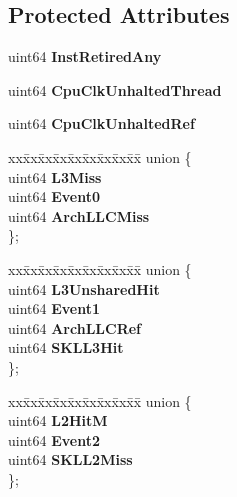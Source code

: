 \subsection*{Protected Attributes}
\begin{DoxyCompactItemize}
\item 
\mbox{\label{classBasicCounterState_a32d89649ba3e48ad8d0cfe05b0e5e2fb}} 
uint64 {\bfseries Inst\+Retired\+Any}
\item 
\mbox{\label{classBasicCounterState_aa55976b14e3f5d61eac958ea5f80f35c}} 
uint64 {\bfseries Cpu\+Clk\+Unhalted\+Thread}
\item 
\mbox{\label{classBasicCounterState_a9c64ac8f2c735b0a693a066ff99b9bc1}} 
uint64 {\bfseries Cpu\+Clk\+Unhalted\+Ref}
\item 
\mbox{\label{classBasicCounterState_a21d9f8b810e7625a425c469cd6fae52f}} 
\begin{tabbing}
xx\=xx\=xx\=xx\=xx\=xx\=xx\=xx\=xx\=\kill
union \{\\
\>uint64 {\bfseries L3Miss}\\
\>uint64 {\bfseries Event0}\\
\>uint64 {\bfseries ArchLLCMiss}\\
\}; \\

\end{tabbing}\item 
\mbox{\label{classBasicCounterState_a26f75e8ad60efecbdb155be81cc78ab8}} 
\begin{tabbing}
xx\=xx\=xx\=xx\=xx\=xx\=xx\=xx\=xx\=\kill
union \{\\
\>uint64 {\bfseries L3UnsharedHit}\\
\>uint64 {\bfseries Event1}\\
\>uint64 {\bfseries ArchLLCRef}\\
\>uint64 {\bfseries SKLL3Hit}\\
\}; \\

\end{tabbing}\item 
\mbox{\label{classBasicCounterState_a4916830df8f468c47f33b7e9d66fdd22}} 
\begin{tabbing}
xx\=xx\=xx\=xx\=xx\=xx\=xx\=xx\=xx\=\kill
union \{\\
\>uint64 {\bfseries L2HitM}\\
\>uint64 {\bfseries Event2}\\
\>uint64 {\bfseries SKLL2Miss}\\
\}; \\


\end{tabbing}
\end{DoxyCompactItemize}
